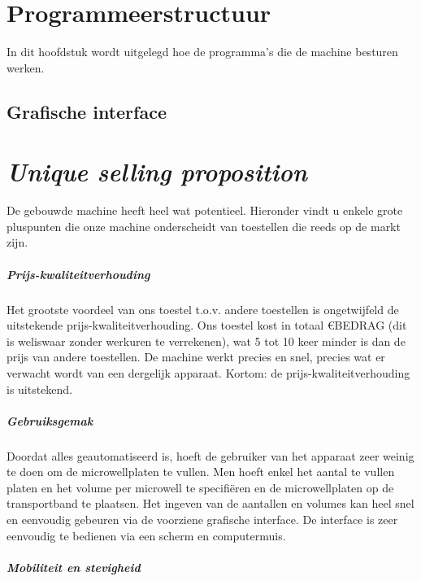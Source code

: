 \documentclass[a4paper,twoside,kulak]{kulakreport} %
\begin{document}
\chapter{Programmeerstructuur}

In dit hoofdstuk wordt uitgelegd hoe de programma's die de machine besturen werken.

\section{Grafische interface}

\chapter{\textit{Unique selling proposition}}

De gebouwde machine heeft heel wat potentieel. Hieronder vindt u enkele grote pluspunten die onze machine onderscheidt van toestellen die reeds op de markt zijn.

\paragraph{Prijs-kwaliteitverhouding}

Het grootste voordeel van ons toestel t.o.v. andere toestellen is ongetwijfeld de uitstekende prijs-kwaliteitverhouding. Ons toestel kost in totaal \euro BEDRAG (dit is weliswaar zonder werkuren te verrekenen), wat 5 tot 10 keer minder is dan de prijs van andere toestellen. De machine werkt precies en snel, precies wat er verwacht wordt van een dergelijk apparaat. Kortom: de prijs-kwaliteitverhouding is uitstekend.

\paragraph{Gebruiksgemak}

Doordat alles geautomatiseerd is, hoeft de gebruiker van het apparaat zeer weinig te doen om de microwellplaten te vullen. Men hoeft enkel het aantal te vullen platen en het volume per microwell te specifiëren en de microwellplaten op de transportband te plaatsen. Het ingeven van de aantallen en volumes kan heel snel en eenvoudig gebeuren via de voorziene grafische interface. De interface is zeer eenvoudig te bedienen via een scherm en computermuis.

\paragraph{Mobiliteit en stevigheid}
\end{document}
